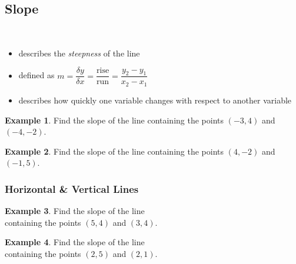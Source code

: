 \documentclass[addpoints,12pt]{exam}
\theoremstyle{definition}
\theoremstyle{break}
\theoremstyle{break}
\newtheorem{example}{Example}[subsection]
\begin{document}
\setcounter{section}{3}
\setcounter{subsection}{2}

\subsection{Slope}

\vspace{.15in}

\begin{definition}[Slope]
\mbox{}\\
\vspace{-.5in}
\begin{itemize}
\item describes the \emph{steepness} of the line
\item defined as $m = \dfrac{\delta y}{\delta x} = \dfrac{\text{rise}}{\text{run}} = \dfrac{y_2-y_1}{x_2-x_1}$
\item describes how quickly one variable changes with respect to another variable
\end{itemize}
\end{definition}

\vspace{.15in}

\begin{example}
Find the slope of the line containing the points $(-3,4)$ and $(-4,-2)$.
\vspace{1in}
\end{example}

\begin{example}
Find the slope of the line containing the points $(4,-2)$ and $(-1,5)$.
\vspace{1in}
\end{example}

\subsubsection*{Horizontal \& Vertical Lines}
\begin{minipage}{.5\textwidth}
\begin{example}
Find the slope of the line\\
containing the points $(5,4)$ and $(3,4)$.
\end{example}
\end{minipage}%
\begin{minipage}{.5\textwidth}
\begin{example}
Find the slope of the line\\
containing the points $(2,5)$ and $(2,1)$.
\end{example}
\end{minipage}%
\end{document}
